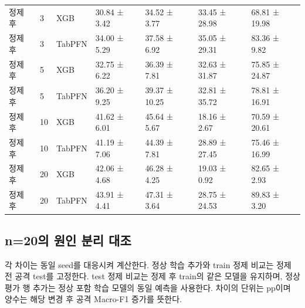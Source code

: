 \begin{longtable}
{}정제 후 & 3 & XGB & 30.84 ± 3.42 & 34.52 ± 3.77 & 33.45 ± 28.98 & 68.81 ± 19.98 \\
{}정제 후 & 3 & TabPFN & 34.00 ± 5.29 & 37.58 ± 6.92 & 35.05 ± 29.31 & 83.36 ± 9.82 \\
{}정제 후 & 5 & XGB & 32.75 ± 6.22 & 36.39 ± 7.81 & 32.63 ± 31.87 & 75.85 ± 24.87 \\
{}정제 후 & 5 & TabPFN & 36.20 ± 9.25 & 39.37 ± 10.25 & 32.81 ± 35.72 & 78.81 ± 16.91 \\
{}정제 후 & 10 & XGB & 41.62 ± 6.01 & 45.64 ± 5.67 & 18.16 ± 2.67 & 70.59 ± 20.61 \\
{}정제 후 & 10 & TabPFN & 41.19 ± 7.06 & 44.39 ± 7.81 & 28.89 ± 27.45 & 75.46 ± 16.99 \\
{}정제 후 & 20 & XGB & 42.06 ± 4.68 & 46.28 ± 4.25 & 19.03 ± 0.92 & 82.65 ± 2.93 \\
{}정제 후 & 20 & TabPFN & 43.91 ± 4.41 & 47.31 ± 3.64 & 28.75 ± 24.53 & 89.83 ± 3.20 \\
\bottomrule
\end{longtable}
\endgroup


\subsection{n=\allowbreak{}20의 원인 분리 대조}
각 차이는 동일 seed를 대응시켜 계산한다. 정상 학습 추가와 train 정제 비교는 정제 전 공격 test를 고정한다. test 정제 비교는 정제 후 train의 같은 모델을 유지하며, 정상 평가 행 추가는 정상 포함 학습 모델의 동일 예측을 사용한다. 차이의 단위는 pp이며 양수는 해당 변경 후 공격 Macro-F1 증가를 뜻한다.

